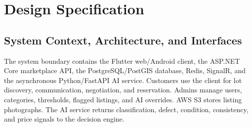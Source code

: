 
\chapter{Design Specification}
\label{chap:design}

\section{System Context, Architecture, and Interfaces }
The system boundary contains the Flutter web/Android client, the ASP.NET Core
marketplace API, the PostgreSQL/PostGIS database, Redis, SignalR, and the
asynchronous Python/FastAPI AI service. Customers use the client for lot
discovery, communication, negotiation, and reservation. Admins manage users,
categories, thresholds, flagged listings, and AI overrides. AWS S3 stores listing
photographs. The AI service returns classification, defect, condition,
consistency, and price signals to the decision engine.

